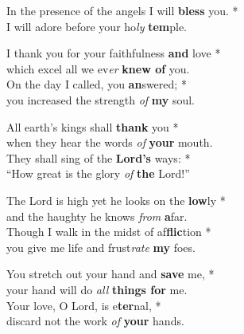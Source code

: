 In the presence of the angels I will \textbf{bless} you. *\\
I will adore before your ho\emph{ly} \textbf{tem}ple.

I thank you for your faithfulness \textbf{and} love *\\
which excel all we ev\emph{er} \textbf{knew of} you.\\
On the day I called, you \textbf{an}swered; *\\
you increased the strength \emph{of} \textbf{my} soul.

All earth's kings shall \textbf{thank} you *\\
when they hear the words \emph{of} \textbf{your} mouth.\\
They shall sing of the \textbf{Lord's} ways: *\\
“How great is the glory \emph{of} \textbf{the} Lord!”

The Lord is high yet he looks on the \textbf{low}ly *\\
and the haughty he knows \emph{from} \textbf{a}far.\\
Though I walk in the midst of af\textbf{flic}tion *\\
you give me life and frust\emph{rate} \textbf{my} foes.

You stretch out your hand and \textbf{save} me, *\\
your hand will do \emph{all} \textbf{things for} me.\\
Your love, O Lord, is e\textbf{ter}nal, *\\
discard not the work \emph{of} \textbf{your} hands.